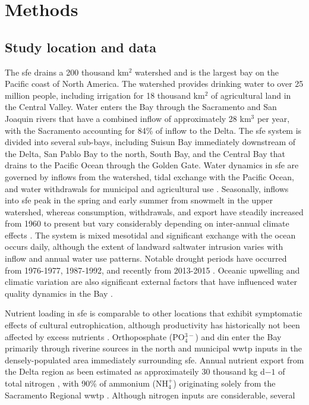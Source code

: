 \documentclass[letterpaper,12pt,oneside]{article}\usepackage[]{graphicx}\usepackage[]{color}
\begin{document}
\section{Methods}

\subsection{Study location and data}

The \ac{sfe} drains a 200 thousand km$^2$ watershed and is the largest bay on the Pacific coast of North America.  The watershed provides drinking water to over 25 million people, including irrigation for 18 thousand km$^2$ of agricultural land in the Central Valley.  Water enters the Bay through the Sacramento and San Joaquin rivers that have a combined inflow of approximately 28 km$^3$ per year, with the Sacramento accounting for 84\% of inflow to the Delta.  The \ac{sfe} system is divided into several sub-bays, including Suisun Bay immediately downstream of the Delta, San Pablo Bay to the north, South Bay, and the Central Bay that drains to the Pacific Ocean through the Golden Gate.  Water dynamics in \ac{sfe} are governed by inflows from the watershed, tidal exchange with the Pacific Ocean, and water withdrawals for municipal and agricultural use \citep{Jassby00}.  Seasonally, inflows into \ac{sfe} peak in the spring and early summer from snowmelt in the upper watershed, whereas consumption, withdrawals, and export have steadily increased from 1960 to present but vary considerably depending on inter-annual climate effects \citep{Cloern12b}.  The system is mixed mesotidal and significant exchange with the ocean occurs daily, although the extent of landward saltwater intrusion varies with inflow and annual water use patterns. Notable drought periods have occurred from 1976-1977, 1987-1992, and recently from 2013-2015 \citep{Cloern15}.  Oceanic upwelling and climatic variation are also significant external factors that have influenced water quality dynamics in the Bay \citep{Cloern07}.

Nutrient loading in \ac{sfe} is comparable to other locations that exhibit symptomatic effects of cultural eutrophication, although productivity has historically not been affected by excess nutrients \citep{Jassby02,Kimmerer12}.  Orthoposphate (PO$_4^{3-}$) and \ac{din} enter the Bay primarily through riverine sources in the north and municipal \ac{wwtp} inputs in the densely-populated area immediately surrounding \ac{sfe}.  Annual nutrient export from the Delta region as been estimated as approximateily 30 thousand kg d$-1$ of total nitrogen \citep[varying with flow,][]{Novick15}, with 90\% of ammonium (NH$_4^{+}$) originating solely from the Sacramento Regional \ac{wwtp} \citep{Jassby08}.  Although nitrogen inputs are considerable, several 
\end{document}
